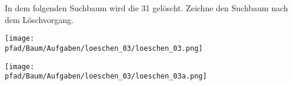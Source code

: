 \question[2]
In dem folgenden Suchbaum wird die 31 gelöscht. Zeichne den
Suchbaum nach dem Löschvorgang.

\texttt{[image: \\pfad/Baum/Aufgaben/loeschen\_03/loeschen\_03.png]}
\begin{solutionbox}{7cm}

\texttt{[image: \\pfad/Baum/Aufgaben/loeschen\_03/loeschen\_03a.png]}
\end{solutionbox}
